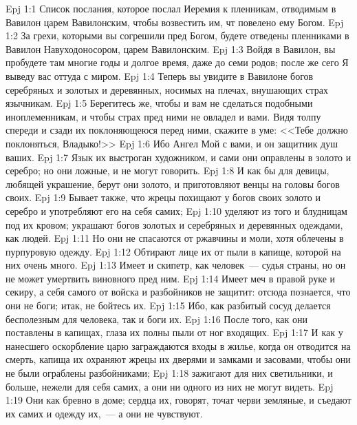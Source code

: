 \vs Epj 1:1 Список послания, которое послал Иеремия к пленникам, отводимым в Вавилон царем Вавилонским, чтобы возвестить им, чт повелено ему Богом.
\rsbpar\vs Epj 1:2 За грехи, которыми вы согрешили пред Богом, будете отведены пленниками в Вавилон Навуходоносором, царем Вавилонским.
\vs Epj 1:3 Войдя в Вавилон, вы пробудете там многие годы и долгое время, даже до семи родов; после же сего Я выведу вас оттуда с миром.
\vs Epj 1:4 Теперь вы увидите в Вавилоне богов серебряных и золотых и деревянных, носимых на плечах, внушающих страх язычникам.
\vs Epj 1:5 Берегитесь же, чтобы и вам не сделаться подобными иноплеменникам, и чтобы страх пред ними не овладел и вами. Видя толпу спереди и сзади их поклоняющеюся перед ними, скажите в уме: <<Тебе должно поклоняться, Владыко!>>
\vs Epj 1:6 Ибо Ангел Мой с вами, и он защитник душ ваших.
\vs Epj 1:7 Язык их выстроган художником, и сами они оправлены в золото и серебро; но они ложные, и не могут говорить.
\vs Epj 1:8 И как бы для девицы, любящей украшение, берут они золото, и приготовляют венцы на головы богов своих.
\vs Epj 1:9 Бывает также, что жрецы похищают у богов своих золото и серебро и употребляют его на себя самих;
\vs Epj 1:10 уделяют из того и блудницам под их кровом; украшают богов золотых и серебряных и деревянных одеждами, как людей.
\vs Epj 1:11 Но они не спасаются от ржавчины и моли, хотя облечены в пурпуровую одежду.
\vs Epj 1:12 Обтирают лице их от пыли в капище, которой на них очень много.
\vs Epj 1:13 Имеет и скипетр, как человек~--- судья страны, но он не может умертвить виновного пред ним.
\vs Epj 1:14 Имеет меч в правой руке и секиру, а себя самого от войска и разбойников не защитит: отсюда познается, что они не боги; итак, не бойтесь их.
\vs Epj 1:15 Ибо, как разбитый сосуд делается бесполезным для человека, так и боги их.
\vs Epj 1:16 После того, как они поставлены в капищах, глаза их полны пыли от ног входящих.
\vs Epj 1:17 И как у нанесшего оскорбление царю заграждаются входы в жилье, когда он отводится на смерть,  капища их охраняют жрецы их дверями и замками и засовами, чтобы они не были ограблены разбойниками;
\vs Epj 1:18 зажигают для них светильники, и больше, нежели для себя самих, а они ни одного из них не могут видеть.
\vs Epj 1:19 Они как бревно в доме; сердца их, говорят, точат черви земляные, и съедают их самих и одежду их,~--- а они не чувствуют.
